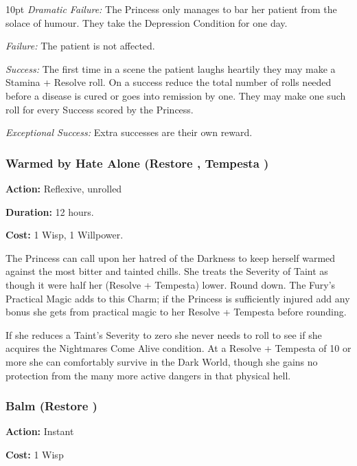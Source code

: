 \begin{myindentpar}{10pt}    \emph{Dramatic Failure:} The Princess only manages to bar her patient from the solace of humour. They take the Depression Condition for one day.

    \emph{Failure:} The patient is not affected.

    \emph{Success:} The first time in a scene the patient laughs heartily they may make a Stamina + Resolve roll. On a success reduce the total number of rolls needed before a disease is cured or goes into remission by one. They may make one such roll for every Success scored by the Princess. 

    \emph{Exceptional Success:} Extra successes are their own reward.

    \end{myindentpar}

\subsubsection*{Warmed by Hate Alone (Restore \textbullet, Tempesta \textbullet\textbullet)}

\noindent \textbf{Action:} Reflexive, unrolled

\noindent \textbf{Duration:} 12 hours.

\noindent \textbf{Cost:} 1 Wisp, 1 Willpower.

The Princess can call upon her hatred of the Darkness to keep herself warmed against the most bitter and tainted chills. She treats the Severity of Taint as though it were half her (Resolve + Tempesta) lower. Round down. The Fury's Practical Magic adds to this Charm; if the Princess is sufficiently injured add any bonus she gets from practical magic to her Resolve + Tempesta before rounding.

If she reduces a Taint's Severity to zero she never needs to roll to see if she acquires the Nightmares Come Alive condition. At a Resolve + Tempesta of 10 or more she can comfortably survive in the Dark World, though she gains no protection from the many more active dangers in that physical hell.

\subsubsection*{Balm (Restore \textbullet\textbullet)}

\noindent \textbf{Action:} Instant 

\noindent \textbf{Cost:} 1 Wisp

